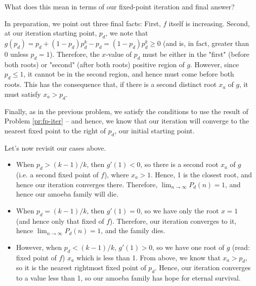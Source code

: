 What does this mean in terms of our fixed-point iteration and final answer?

In preparation, we point out three final facts: First, $f$ itself is increasing. Second, at our iteration starting point, $p_d$, we note that $g(p_d) = p_d + (1 - p_d)p_d^k - p_d = (1 - p_d)p_d^k \geq 0$ (and is, in fact, greater than 0 unless $p_d = 1$). Therefore, the $x$-value of $p_d$ must be either in the "first" (before both roots) or "second" (after both roots) positive region of $g$. However, since $p_d \leq 1$, it cannot be in the second region, and hence must come before both roots. This has the consequence that, if there is a second distinct root $x_a$ of $g$, it must satisfy $x_a > p_d$. 


Finally, as in the previous problem, we satisfy the conditions to use the result of Problem \ref{pr:fp-iter} -- and hence, we know that our iteration will converge to the nearest fixed point to the right of $p_d$, our initial starting point.

Let's now revisit our cases above. 

\begin{itemize}
\item When $p_d > (k-1)/k$, then $g'(1) < 0$, so there is a second root $x_a$ of $g$ (i.e. a second fixed point of $f$), where $x_a > 1$. Hence, 1 is the closest root, and hence our iteration converges there. Therefore, $\lim_{n \rightarrow \infty} P_d(n) = 1$, and hence our amoeba family will die. 
\item When $p_d = (k-1)/k$, then $g'(1) = 0$, so we have only the root $x = 1$ (and hence only that fixed of $f$). Therefore, our iteration converges to it, hence $\lim_{n \rightarrow \infty} P_d(n) = 1$, and the family dies.
\item However, when $p_d < (k-1)/k$, $g'(1) > 0$, so we have one root of $g$ (read: fixed point of $f$) $x_a$ which is less than 1. From above, we know that $x_a > p_d$, so it is the nearest rightmost fixed point of $p_d$. Hence, our iteration converges to a value less than 1, so our amoeba family has hope for eternal survival. 
\end{itemize}

% 







